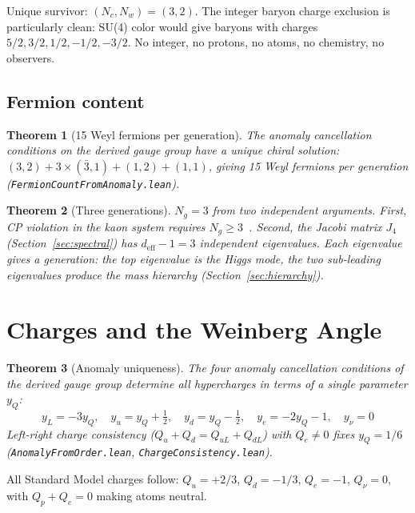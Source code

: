 \documentclass[11pt,letterpaper]{article}
\newtheorem{theorem}{Theorem}
\theoremstyle{remark}
\newcommand{\lean}[1]{\texttt{\small #1}}
\begin{document}
\noindent Unique survivor: $(N_c, N_w) = (3, 2)$. The integer baryon
charge exclusion is particularly clean: SU(4) color would give
baryons with charges $5/2, 3/2, 1/2, -1/2, -3/2$. No integer, no
protons, no atoms, no chemistry, no observers.

\subsection{Fermion content}

\begin{theorem}[15 Weyl fermions per generation]
The anomaly cancellation conditions on the derived gauge group have
a unique chiral solution: $(3,2) + 3 \times (\bar{3},1) + (1,2) +
(1,1)$, giving 15 Weyl fermions per generation
(\lean{FermionCountFromAnomaly.lean}).
\end{theorem}

\begin{theorem}[Three generations]
$N_g = 3$ from two independent arguments. First, CP violation in the
kaon system requires $N_g \geq 3$~\cite{KobayashiMaskawa}. Second,
the Jacobi matrix $J_4$ (Section~\ref{sec:spectral}) has
$d_{\mathrm{eff}} - 1 = 3$ independent eigenvalues. Each eigenvalue
gives a generation: the top eigenvalue is the Higgs mode, the two
sub-leading eigenvalues produce the mass hierarchy (Section~\ref{sec:hierarchy}).
\end{theorem}

\section{Charges and the Weinberg Angle}
\label{sec:charges}

\begin{theorem}[Anomaly uniqueness]
\label{thm:anomaly}
The four anomaly cancellation conditions of the derived gauge group
determine all hypercharges in terms of a single parameter $y_Q$:
\[
  y_L = -3 y_Q, \quad
  y_u = y_Q + \tfrac{1}{2}, \quad
  y_d = y_Q - \tfrac{1}{2}, \quad
  y_e = -2 y_Q - 1, \quad
  y_\nu = 0
\]
Left-right charge consistency ($Q_u + Q_d = Q_{uL} + Q_{dL}$) with
$Q_e \neq 0$ fixes $y_Q = 1/6$
(\lean{AnomalyFromOrder.lean}, \lean{ChargeConsistency.lean}).
\end{theorem}

\noindent All Standard Model charges follow: $Q_u = +2/3$, $Q_d =
-1/3$, $Q_e = -1$, $Q_\nu = 0$, with $Q_p + Q_e = 0$ making atoms
neutral.
\end{document}
